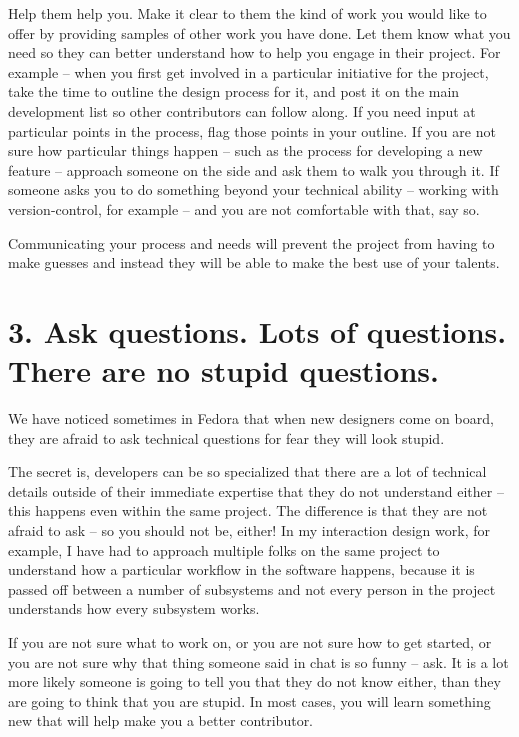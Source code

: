 Help them help you. Make it clear to them the kind of work you would like to offer
by providing samples of other
work you have done. Let them know what you need so they can better understand how
to help you engage in their project. For example -- when you first get involved
in a particular initiative for the project, take the time to outline the design
process for it, and post it on the main development list so other contributors
can follow along. If you need input at particular points in the process, flag
those points in your outline. If you are not sure how particular things happen --
such as the process for developing a new feature -- approach someone on the side
and ask them to walk you through it. If someone asks you to do something beyond
your technical ability -- working with version-control, for example -- and you are
not comfortable with that, say so.

Communicating your process and needs will prevent the project from having to
make guesses and instead they will be able to make the best use of your talents.

\section*{3. Ask questions. Lots of questions. There are no stupid questions.}

We have noticed sometimes in Fedora that when new designers come on board, they
are afraid to ask technical questions for fear they will look stupid. 

The secret is, developers can be so specialized that there are a lot of
technical details outside of their immediate expertise that they do not
understand either -- this happens even within the same project. The difference is
that they are not afraid to ask -- so you should not be, either! In my interaction
design work, for example, I have had to approach multiple folks on the same
project to understand how a particular workflow in the software happens, because
it is passed off between a number of subsystems and not every person in the
project understands how every subsystem works. 

If you are not sure what to work on, or you are not sure how to get started, or
you are not sure why that thing someone said in chat is so funny -- ask. It is a
lot more likely someone is going to tell you that they do not know either, than
they are going to think that you are stupid. In most cases, you will learn
something new that will help make you a better contributor.

